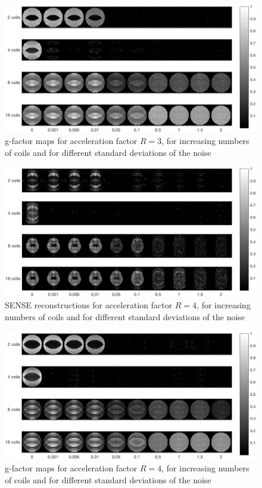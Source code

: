 \begin{figure}[H]
    \centering
    \includegraphics[width=1\textwidth,keepaspectratio]{R3gfactnoiseb}
    \caption{g-factor maps for acceleration factor $R = 3$, for increasing numbers of coils and for different standard deviations of the noise}
    \label{fig:R3gfactnoisej}
\end{figure}

\begin{figure}[H]
    \centering
    \includegraphics[width=1\textwidth,keepaspectratio]{R4recnoiseb}
    \caption{SENSE reconstructions for acceleration factor $R = 4$, for increasing numbers of coils and for different standard deviations of the noise}
    \label{fig:R4recsnoisej}
\end{figure}

\begin{figure}[H]
    \centering
    \includegraphics[width=1\textwidth,keepaspectratio]{R4gfactnoiseb}
    \caption{g-factor maps for acceleration factor $R = 4$, for increasing numbers of coils and for different standard deviations of the noise}
    \label{fig:R4gfactnoisej}
\end{figure}


